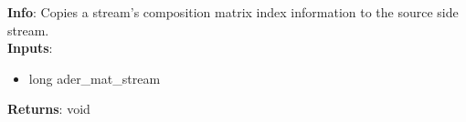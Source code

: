 \textbf{Info}: Copies a stream's composition matrix index information to the
source side stream.\\

\noindent \textbf{Inputs}:
\begin{itemize}
\item{long ader\_mat\_stream}
\end{itemize}

\noindent \textbf{Returns}: void

